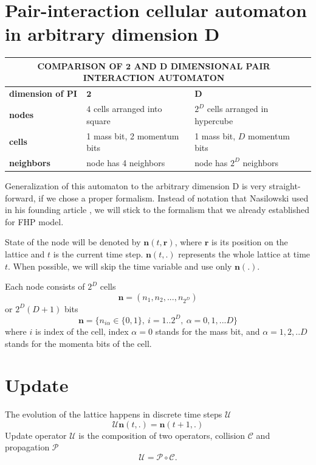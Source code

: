\section{Pair-interaction cellular automaton in arbitrary dimension D}
\begin{center}
    \begin{tabular}{| l | l | l | l |}
    \hline
    \multicolumn{3}{|c|}{COMPARISON OF $\bm{2}$ AND $\bm{D}$ DIMENSIONAL PAIR INTERACTION AUTOMATON}\\ \hline
    \textbf{dimension of PI} & $\bm{2}$ & $\bm{D}$ \\ \hline
    \textbf{nodes} & $4$ cells arranged into square & $2^D$ cells arranged in hypercube \\ \hline
    \textbf{cells} & 1 mass bit, 2 momentum bits  & 1 mass bit, $D$ momentum bits \\ \hline
    \textbf{neighbors} & node has 4 neighbors & node has $2^D$ neighbors  \\ \hline
    \end{tabular}
\end{center}

Generalization of this automaton to the arbitrary dimension D is very straight-forward, if we chose a proper formalism. Instead of notation that Nasilowski used in his founding article \cite{nasilowski}, we will stick to the formalism that we already established for FHP model.

State of the node will be denoted by $\bm{n}(t,\bm{r})$, where $\bm{r}$ is its position on the lattice and $t$ is the current time step. $\bm{n}(t,.)$ represents the whole lattice at time $t$. When possible, we will skip the time variable and use only $\bm{n}(.)$.

Each node consists of $2^D$ cells
\begin{equation}
\bm{n} = (n_1, n_2, ... , n_{2^D})
\end{equation}
or $2^D(D+1)$ bits
\begin{equation}
\bm{n} = \big\{ n_{i\alpha} \in \big\{0,1\big\},~i = 1..2^D, ~\alpha = 0,1,...D\big\}
\end{equation}
where $i$ is index of the cell, index $\alpha = 0$ stands for the mass bit, and $\alpha = 1,2,..D$ stands for the momenta bits of the cell.

\section{Update}
The evolution of the lattice happens in discrete time steps $\mathcal{U}$
\begin{equation}
\mathcal{U} \bm{n}(t,.) = \bm{n}(t+1,.)
\end{equation} 
Update operator $\mathcal{U}$ is the composition of two operators, collision $\mathcal{C}$ and propagation $\mathcal{P}$
\begin{equation}
\mathcal{U} = \mathcal{P} \circ \mathcal{C}.
\end{equation} 

